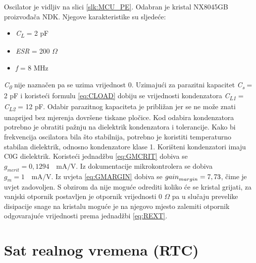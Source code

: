 Oscilator je vidljiv na slici \ref{slk:MCU_PE}. Odabran je kristal NX8045GB proizvođača NDK. Njegove karakteristike su sljedeće:
\begin{itemize}
    \item \textit{C\textsubscript{L}} = 2 pF
    \item \textit{ESR} = 200 $\Omega$
    \item \textit{f} = 8 MHz
\end{itemize}
\textit{C\textsubscript{0}} nije naznačen pa se uzima vrijednost 0. Uzimajući za parazitni kapacitet \textit{C\textsubscript{s}} = 2 pF i koristeći formulu \ref{eq:CLOAD} dobiju se vrijednosti kondenzatora \textit{C\textsubscript{L1}} = \textit{C\textsubscript{L2}} = 12 pF. Odabir parazitnog kapaciteta je približan jer se ne može znati unaprijed bez mjerenja dovršene tiskane pločice. Kod odabira kondenzatora potrebno je obratiti pažnju na dielektrik kondenzatora i tolerancije. Kako bi frekvencija oscilatora bila što stabilnija, potrebno je koristiti temperaturno stabilan dielektrik, odnosno kondenzatore klase 1. Korišteni kondenzatori imaju C0G dielektrik. Koristeći jednadžbu \ref{eq:GMCRIT} dobiva se ${g_{mcrit} = 0,1294 \quad \textrm{mA/V}}$. Iz dokumentacije mikrokontrolera se dobiva ${g_m = 1\quad \textrm{mA/V}}$. Iz uvjeta \ref{eq:GMARGIN} dobiva se ${{gain}_{margin}=\nolinebreak 7,73}$, čime je uvjet zadovoljen. S obzirom da nije moguće odrediti koliko će se kristal grijati, za vanjski otpornik postavljen je otpornik vrijednosti 0 $\Omega$ pa u slučaju prevelike disipacije snage na kristalu moguće je na njegovo mjesto zalemiti otpornik odgovarajuće vrijednosti prema jednadžbi \ref{eq:REXT}.

\section{Sat realnog vremena (RTC)}

